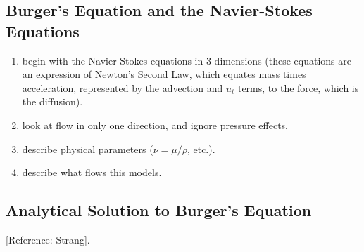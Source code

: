 \subsection{Burger's Equation and the Navier-Stokes Equations}
\label{lab1:ap:burgers}

\begin{enumerate}
\item begin with the Navier-Stokes equations in 3 dimensions  (these
  equations are an expression of Newton's Second Law, which equates
  mass times acceleration, represented by the advection and $u_t$
  terms, to the force, which is the diffusion).
\item look at flow in only one direction, and ignore pressure effects.
\item describe physical parameters ($\nu=\mu/\rho$, etc.).
\item describe what flows this models.
\end{enumerate}

\subsection{Analytical Solution to Burger's Equation}
\label{lab1:ap:burgers-soln}

[Reference: Strang\cite[p.~587]{strang-am}]. 

